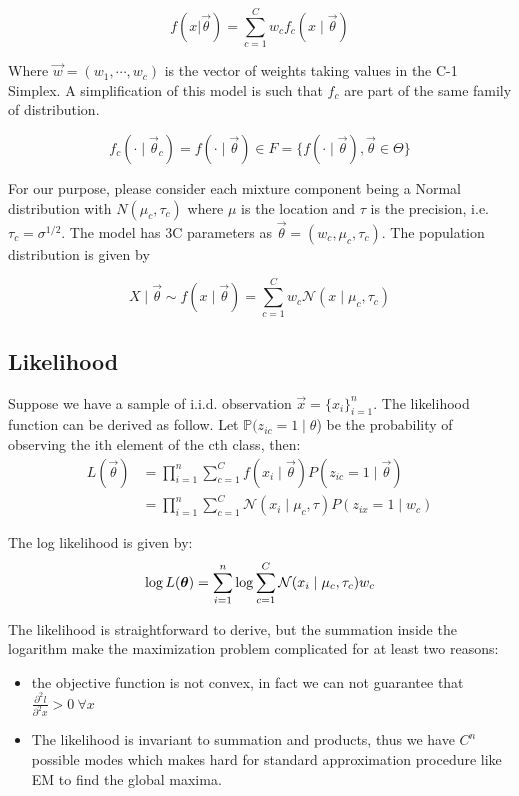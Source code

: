 \documentclass{article}
\begin{document}
\begin{equation}
f(x|\vec \theta) = \sum_{c = 1}^C w_c f_c(x \mid \vec \theta)
\end{equation}

Where $\vec w = (w_1,\cdots , w_c)$ is the vector of weights taking values in the C-1 Simplex. A simplification of this model is such that $f_c$ are part of the same family of distribution.

\begin{equation}
f_c (\cdot \mid \vec \theta_c) = f( \cdot \mid \vec \theta) \in  F = \{f(\cdot \mid \vec \theta), \vec \theta \in \Theta \}
\end{equation}

For our purpose, please consider each mixture component being a Normal distribution with $N(\mu_c, \tau_c)$ where $\mu$ is the location and $\tau$ is the precision, i.e. $\tau_c = \sigma^{1/2}$. The model has 3C parameters as  $\vec \theta = (w_c, \mu_c, \tau_c)$. The population distribution is given by

\begin{equation}
X \mid \vec \theta \sim f(x \mid  \vec \theta)  = \sum_{c = 1}^C w_c \mathcal{N}(x \mid \mu_c,\tau_c)
\end{equation}

\subsection{Likelihood}
Suppose we have a sample of i.i.d. observation $\vec x = \{x_i\}_{i=1}^n$. The likelihood function can be derived as follow. Let $\mathbb{P}(z_{ic} = 1 \mid \theta$) be the probability of observing the ith element of the cth class, then:
\begin{equation}
\begin{split}
L(\vec \theta) &= \prod_{i=1}^n  \sum_{c=1}^C f(x_i \mid \vec\theta) P(z_{ic} = 1 \mid \vec \theta ) \\
&= \prod_{i=1}^n \sum_{c=1}^C \mathcal{N}(x_i \mid \mu_c, \tau) P(z_{ix} = 1 \mid w_{c})
\end{split}
\end{equation}

The log likelihood is given by:
\begin{equation}
\log L(\boldsymbol{\theta})  = \sum_{i=1}^n \log \sum_{c=1}^C \mathcal{N}(x_i \mid \mu_c, \tau_c) w_{c}
\end{equation}

The likelihood is straightforward to derive, but the summation inside the logarithm make the maximization problem complicated for at least two reasons:
\begin{itemize}
\item the objective function is not convex, in fact we can not guarantee that $\frac{\partial^2 l}{\partial^2 x} > 0 \ \forall x$
\item The likelihood is invariant to summation and products, thus we have $C^n$ possible modes which makes hard for standard approximation procedure like EM to find the global maxima.
\end{itemize}
\end{document}
